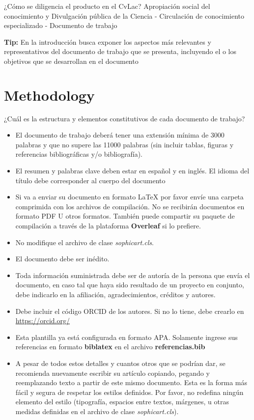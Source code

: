\documentclass{sophicart}
\begin{document}
¿Cómo se diligencia el producto en el CvLac?
Apropiación social del conocimiento y Divulgación pública de la Ciencia - Circulación de conocimiento especializado - Documento de trabajo

\textbf{Tip:} En la introducción busca exponer los aspectos más relevantes y representativos del documento de trabajo que se presenta, incluyendo el o los objetivos que se desarrollan en el documento

\section{Methodology}

¿Cuál es la estructura y elementos constitutivos de cada documento de trabajo?

\begin{itemize}
  \item El documento de trabajo deberá tener una extensión mínima de 3000 palabras y que no supere las 11000 palabras (sin incluir tablas, figuras y referencias bibliográficas y/o bibliografía).
  \item El resumen y palabras clave deben estar en español y en inglés. El idioma del título debe corresponder al cuerpo del documento
  \item Si va a enviar su documento en formato \LaTeX\xspace  por favor envíe una carpeta comprimida con los archivos de compilación. No se recibirán documentos en formato PDF U otros formatos. También puede compartir su paquete de compilación a través de la plataforma \textbf{Overleaf} si lo prefiere.
  \item No modifique el archivo de clase \textit{sophicart.cls}.
  \item El documento debe ser inédito. 
  \item Toda información suministrada debe ser de autoría de la persona que envía el documento, en caso tal que haya sido resultado de un proyecto en conjunto, debe indicarlo en la afiliación, agradecimientos, créditos y autores. 
  \item Debe incluir el código ORCID de los autores. Si no lo tiene, debe crearlo en \url{https://orcid.org/}
  \item Esta plantilla ya está configurada en formato APA. Solamente ingrese sus referencias en formato \textbf{biblatex} en el archivo \textbf{referencias.bib}
  \item A pesar de todos estos detalles y cuantos otros que se podrían dar, se recomienda nuevamente escribir su artículo copiando, pegando y reemplazando texto a partir de este mismo documento. Esta es la forma más fácil y segura de respetar los estilos definidos. Por favor, no redefina ningún elemento del estilo (tipografía, espacios entre textos, márgenes, u otras medidas definidas en el archivo de clase \textit{sophicart.cls}).
  
\end{itemize}
\end{document}
